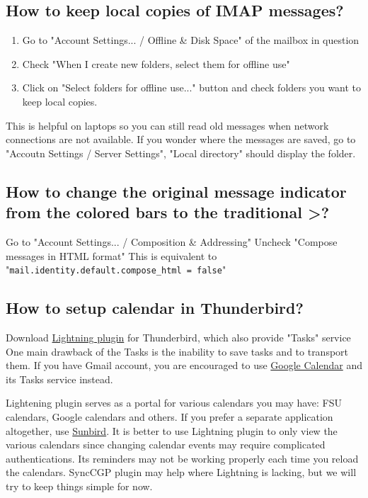 \documentclass[12pt,a4paper]{article}
\begin{document}
\subsection*{How to keep local copies of IMAP messages?}
\begin{enumerate}
    \item Go to "Account Settings... / Offline \& Disk Space" of the mailbox in question
    \item Check "When I create new folders, select them for offline use"
    \item Click on "Select folders for offline use..." button and check folders you want to keep local copies.
\end{enumerate}
This is helpful on laptops so you can still read old messages when network connections are not available. If you wonder where the messages are saved, go to "Accoutn Settings / Server Settings", "Local directory" should display the folder.

\subsection*{How to change the original message indicator from the colored bars to the traditional >?}
Go to "Account Settings... / Composition \& Addressing"
Uncheck "Compose messages in HTML format"
This is equivalent to "\texttt{mail.identity.default.compose\_html = false}"

\subsection*{How to setup calendar in Thunderbird?}
Download \href{https://addons.thunderbird.net/en-us/thunderbird/addon/lightning/}{Lightning plugin} for Thunderbird, which also provide "Tasks" service
One main drawback of the Tasks is the inability to save tasks and to transport them. If you have Gmail account, you are encouraged to use \href{https://www.google.com/calendar}{Google Calendar} and its Tasks service instead.

Lightening plugin serves as a portal for various calendars you may have: FSU calendars, Google calendars and others. If you prefer a separate application altogether, use \href{http://www.mozilla.org/projects/calendar/sunbird.html}{Sunbird}. It is better to use Lightning plugin to only view the various calendars since changing calendar events may require complicated authentications. Its reminders may not be working properly each time you reload the calendars. SyncCGP plugin may help where Lightning is lacking, but we will try to keep things simple for now.
\end{document}
